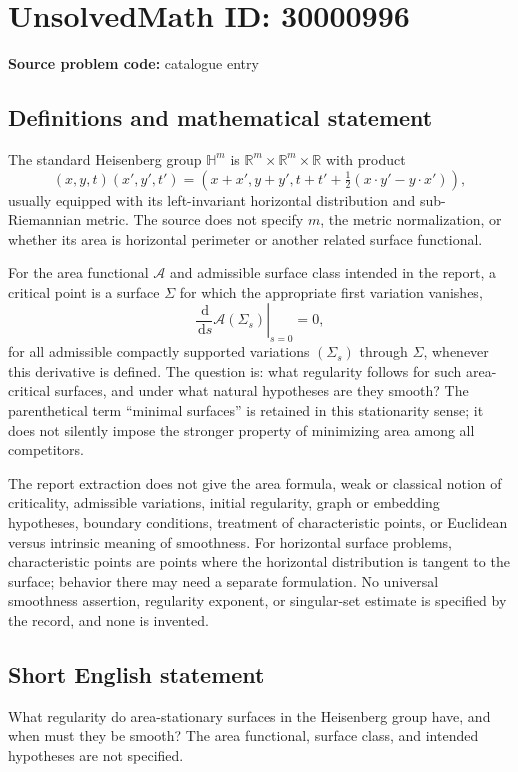 \documentclass[11pt]{article}
\newcommand{\R}{\mathbb{R}}
\newcommand{\dd}{\,\mathrm{d}}
\begin{document}
\section*{UnsolvedMath ID: 30000996}
\textbf{Source problem code:} catalogue entry
\subsection{Definitions and mathematical statement}
The standard Heisenberg group \(\mathbb H^m\) is \(\R^m\times\R^m\times\R\) with product
\[
(x,y,t)(x',y',t')=(x+x',y+y',t+t'+\tfrac12(x\cdot y'-y\cdot x')),
\]
usually equipped with its left-invariant horizontal distribution and sub-Riemannian metric. The source does not specify \(m\), the metric normalization, or whether its area is horizontal perimeter or another related surface functional.

For the area functional \(\mathcal A\) and admissible surface class intended in the report, a critical point is a surface \(\Sigma\) for which the appropriate first variation vanishes,
\[
\left.\frac{\dd}{\dd s}\mathcal A(\Sigma_s)\right|_{s=0}=0,
\]
for all admissible compactly supported variations \((\Sigma_s)\) through \(\Sigma\), whenever this derivative is defined. The question is: what regularity follows for such area-critical surfaces, and under what natural hypotheses are they smooth? The parenthetical term ``minimal surfaces'' is retained in this stationarity sense; it does not silently impose the stronger property of minimizing area among all competitors.

The report extraction does not give the area formula, weak or classical notion of criticality, admissible variations, initial regularity, graph or embedding hypotheses, boundary conditions, treatment of characteristic points, or Euclidean versus intrinsic meaning of smoothness. For horizontal surface problems, characteristic points are points where the horizontal distribution is tangent to the surface; behavior there may need a separate formulation. No universal smoothness assertion, regularity exponent, or singular-set estimate is specified by the record, and none is invented.
\subsection{Short English statement}
What regularity do area-stationary surfaces in the Heisenberg group have, and when must they be smooth? The area functional, surface class, and intended hypotheses are not specified.
\end{document}
